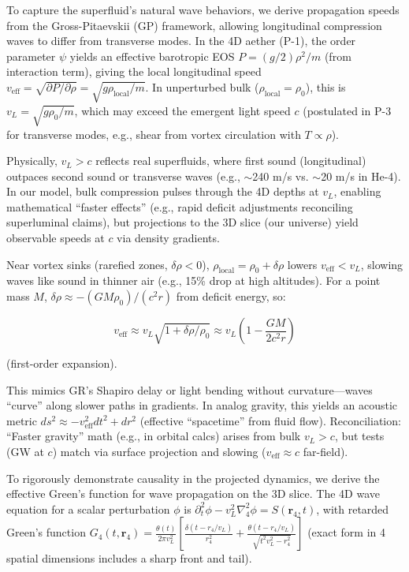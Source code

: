 \documentclass{article}
\begin{document}
To capture the superfluid's natural wave behaviors, we derive propagation speeds from the Gross-Pitaevskii (GP) framework, allowing longitudinal compression waves to differ from transverse modes. In the 4D aether (P-1), the order parameter $\psi$ yields an effective barotropic EOS $P = (g / 2) \rho^2 / m$ (from interaction term), giving the local longitudinal speed $v_{\text{eff}} = \sqrt{\partial P / \partial \rho} = \sqrt{g \rho_{\text{local}} / m}$. In unperturbed bulk ($\rho_{\text{local}} = \rho_0$), this is $v_L = \sqrt{g \rho_0 / m}$, which may exceed the emergent light speed $c$ (postulated in P-3 for transverse modes, e.g., shear from vortex circulation with $T \propto \rho$).

Physically, $v_L > c$ reflects real superfluids, where first sound (longitudinal) outpaces second sound or transverse waves (e.g., $\sim$240 m/s vs. $\sim$20 m/s in He-4). In our model, bulk compression pulses through the 4D depths at $v_L$, enabling mathematical ``faster effects'' (e.g., rapid deficit adjustments reconciling superluminal claims), but projections to the 3D slice (our universe) yield observable speeds at $c$ via density gradients.

Near vortex sinks (rarefied zones, $\delta \rho < 0$), $\rho_{\text{local}} = \rho_0 + \delta \rho$ lowers $v_{\text{eff}} < v_L$, slowing waves like sound in thinner air (e.g., 15\% drop at high altitudes). For a point mass $M$, $\delta \rho \approx - (G M \rho_0) / (c^2 r)$ from deficit energy, so:

\[
v_{\text{eff}} \approx v_L \sqrt{1 + \delta \rho / \rho_0} \approx v_L \left(1 - \frac{G M}{2 c^2 r}\right)
\]

(first-order expansion).

This mimics GR's Shapiro delay or light bending without curvature---waves ``curve'' along slower paths in gradients. In analog gravity, this yields an acoustic metric $ds^2 \approx - v_{\text{eff}}^2 dt^2 + dr^2$ (effective ``spacetime'' from fluid flow). Reconciliation: ``Faster gravity'' math (e.g., in orbital calcs) arises from bulk $v_L > c$, but tests (GW at $c$) match via surface projection and slowing ($v_{\text{eff}} \approx c$ far-field).

To rigorously demonstrate causality in the projected dynamics, we derive the effective Green's function for wave propagation on the 3D slice. The 4D wave equation for a scalar perturbation $\phi$ is $\partial_t^2 \phi - v_L^2 \nabla_4^2 \phi = S(\mathbf{r}_4, t)$, with retarded Green's function $G_4(t, \mathbf{r}_4) = \frac{\theta(t)}{2\pi v_L^2} \left[ \frac{\delta(t - r_4 / v_L)}{r_4^2} + \frac{\theta(t - r_4 / v_L)}{\sqrt{t^2 v_L^2 - r_4^2}} \right]$ (exact form in 4 spatial dimensions includes a sharp front and tail).
\end{document}
